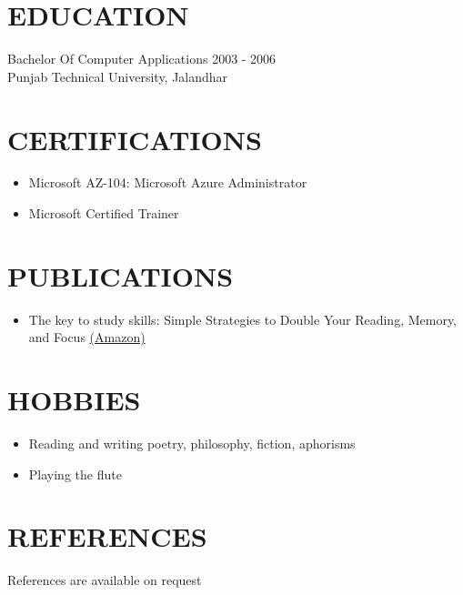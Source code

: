 \documentclass[margin, 10pt]{res} %
\begin{document}
\begin{resume}
\section{EDUCATION}
Bachelor Of Computer Applications \hfill 2003 - 2006 \\
Punjab Technical University, Jalandhar 
\section{CERTIFICATIONS}
\begin{itemize}
\item Microsoft AZ-104: Microsoft Azure Administrator 
\item Microsoft Certified Trainer
\end{itemize}
\section{PUBLICATIONS}
\begin{itemize}
\item The key to study skills: Simple Strategies to Double Your Reading, Memory, and Focus \hfill \href{https://amzn.to/3myBJlJ}{(Amazon)}
\end{itemize}
\section{HOBBIES}
\begin{itemize}
\item Reading and writing poetry, philosophy, fiction, aphorisms
\item Playing the flute
\end{itemize}
\section{REFERENCES}
References are available on request


\end{resume}
\end{document}
